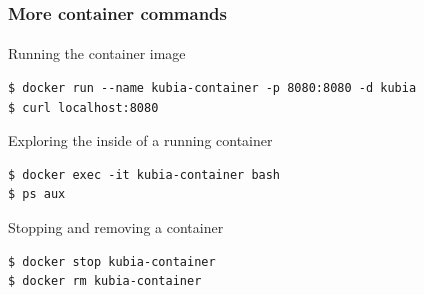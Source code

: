 
\begin{frame}[fragile]
	\frametitle{More container commands}
	\framesubtitle{}
	Running the container image
	\begin{lstlisting}[numbers=none, basicstyle=\ttfamily]
$ docker run --name kubia-container -p 8080:8080 -d kubia
$ curl localhost:8080
	\end{lstlisting}
	Exploring the inside of a running container
	\begin{lstlisting}[numbers=none, basicstyle=\ttfamily]
$ docker exec -it kubia-container bash
$ ps aux
	\end{lstlisting}
	Stopping and removing a container
	\begin{lstlisting}[numbers=none, basicstyle=\ttfamily]
$ docker stop kubia-container
$ docker rm kubia-container
	\end{lstlisting}
\end{frame}


